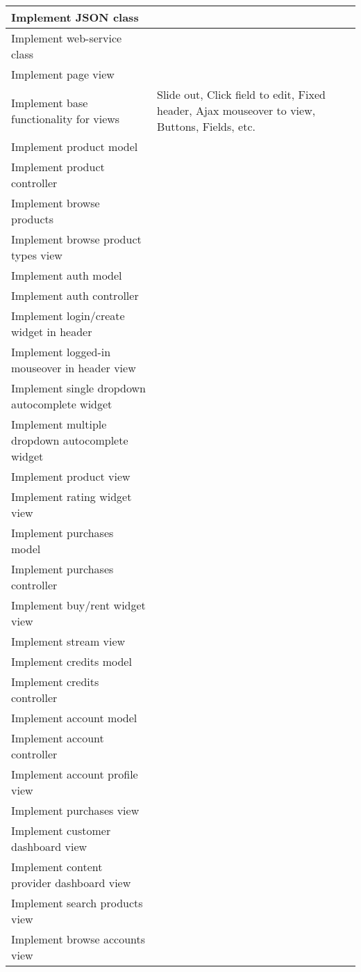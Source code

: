 \begin{longtable}{|p{200px}|p{200px}|}
	Implement JSON class & ~  \\ \hline
	Implement web-service class & ~ \\ \hline
	Implement page view & ~  \\ \hline
	Implement base functionality for views & Slide out, Click field to edit, Fixed header, Ajax mouseover to view, Buttons, Fields,	etc. \\ \hline
	Implement product model & ~  \\ \hline
	Implement product controller & ~  \\ \hline
	Implement browse products & ~  \\ \hline
	Implement browse product types view & ~  \\
	Implement auth model & ~  \\ \hline
	Implement auth controller & ~  \\ \hline
	Implement login/create widget in header & ~  \\ \hline
	Implement logged-in mouseover in header view & ~  \\ \hline	
	Implement single dropdown autocomplete widget & ~  \\ \hline
	Implement multiple dropdown autocomplete widget & ~  \\ \hline
	Implement product view & ~  \\ \hline
	Implement rating widget view & ~  \\ \hline
	Implement purchases model & ~  \\ \hline
	Implement purchases controller & ~  \\ \hline
	Implement buy/rent widget view & ~  \\ \hline
	Implement stream view & ~  \\ \hline
	Implement credits model & ~  \\ \hline
	Implement credits controller & ~  \\ \hline
	Implement account model & ~  \\ \hline
	Implement account controller & ~  \\ \hline
	Implement account profile view & ~  \\ \hline
	Implement purchases view & ~  \\ \hline
	Implement customer dashboard view & ~  \\ \hline
	Implement content provider dashboard view & ~  \\ \hline
	Implement search products view & ~  \\ \hline
	Implement browse accounts view & ~  \\ 

\end{longtable}
